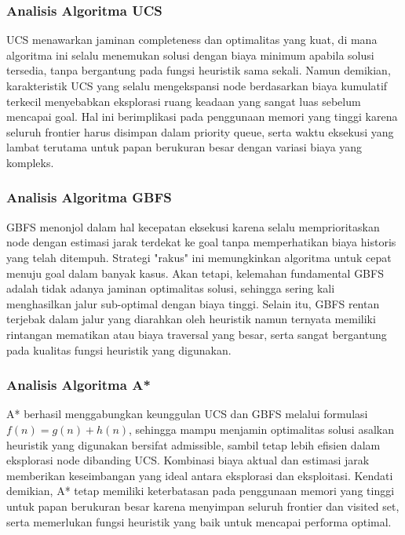 \documentclass[12pt,a4paper]{article}
\begin{document}
\subsubsection{Analisis Algoritma  UCS }

UCS menawarkan jaminan completeness dan optimalitas yang kuat, di mana algoritma ini selalu menemukan solusi dengan biaya minimum apabila solusi tersedia, tanpa bergantung pada fungsi heuristik sama sekali. Namun demikian, karakteristik UCS yang selalu mengekspansi node berdasarkan biaya kumulatif terkecil menyebabkan eksplorasi ruang keadaan yang sangat luas sebelum mencapai goal. Hal ini berimplikasi pada penggunaan memori yang tinggi karena seluruh frontier harus disimpan dalam priority queue, serta waktu eksekusi yang lambat terutama untuk papan berukuran besar dengan variasi biaya yang kompleks.

\subsubsection{Analisis Algoritma  GBFS }

GBFS menonjol dalam hal kecepatan eksekusi karena selalu memprioritaskan node dengan estimasi jarak terdekat ke goal tanpa memperhatikan biaya historis yang telah ditempuh. Strategi "rakus" ini memungkinkan algoritma untuk cepat menuju goal dalam banyak kasus. Akan tetapi, kelemahan fundamental GBFS adalah tidak adanya jaminan optimalitas solusi, sehingga sering kali menghasilkan jalur sub-optimal dengan biaya tinggi. Selain itu, GBFS rentan terjebak dalam jalur yang diarahkan oleh heuristik namun ternyata memiliki rintangan mematikan atau biaya traversal yang besar, serta sangat bergantung pada kualitas fungsi heuristik yang digunakan.

\subsubsection{Analisis Algoritma  A* }

A* berhasil menggabungkan keunggulan UCS dan GBFS melalui formulasi $f(n) = g(n) + h(n)$, sehingga mampu menjamin optimalitas solusi asalkan heuristik yang digunakan bersifat admissible, sambil tetap lebih efisien dalam eksplorasi node dibanding UCS. Kombinasi biaya aktual dan estimasi jarak memberikan keseimbangan yang ideal antara eksplorasi dan eksploitasi. Kendati demikian, A* tetap memiliki keterbatasan pada penggunaan memori yang tinggi untuk papan berukuran besar karena menyimpan seluruh frontier dan visited set, serta memerlukan fungsi heuristik yang baik untuk mencapai performa optimal.
\end{document}

